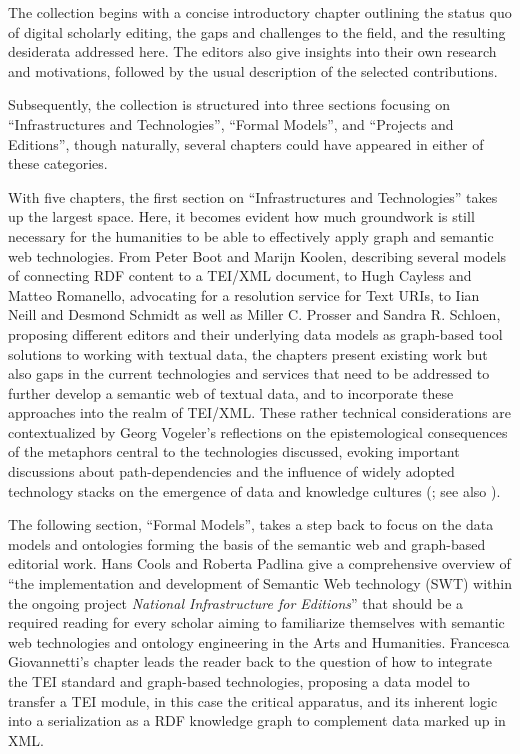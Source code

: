 \documentclass{article}
\begin{document}
The collection begins with a concise introductory chapter outlining the
status quo of digital scholarly editing, the gaps and challenges to the
field, and the resulting desiderata addressed here. The editors also
give insights into their own research and motivations, followed by the
usual description of the selected contributions.

Subsequently, the collection is structured into three sections focusing
on ``Infrastructures and Technologies'', ``Formal Models'', and
``Projects and Editions'', though naturally, several chapters could have
appeared in either of these categories.

With five chapters, the first section on ``Infrastructures and
Technologies'' takes up the largest space. Here, it becomes evident how
much groundwork is still necessary for the humanities to be able to
effectively apply graph and semantic web technologies. From Peter Boot
and Marijn Koolen, describing several models of connecting RDF content
to a TEI/XML document, to Hugh Cayless and Matteo Romanello, advocating
for a resolution service for Text URIs, to Iian Neill and Desmond
Schmidt as well as Miller C. Prosser and Sandra R. Schloen, proposing
different editors and their underlying data models as graph-based tool
solutions to working with textual data, the chapters present existing
work but also gaps in the current technologies and services that need to
be addressed to further develop a semantic web of textual data, and to
incorporate these approaches into the realm of TEI/XML. These rather
technical considerations are contextualized by Georg Vogeler's
reflections on the epistemological consequences of the metaphors central
to the technologies discussed, evoking important discussions about
path-dependencies and the influence of widely adopted technology stacks
on the emergence of data and knowledge cultures 
(\cite{mahoney_historical_2006}; see also \cite{acker_data_2019}).

The following section, ``Formal Models'', takes a step back to focus on
the data models and ontologies forming the basis of the semantic web and
graph-based editorial work. Hans Cools and Roberta Padlina give a
comprehensive overview of ``the implementation and development of
Semantic Web technology (SWT) within the ongoing project \emph{National
Infrastructure for Editions}'' that should be a required reading for
every scholar aiming to familiarize themselves with semantic web
technologies and ontology engineering in the Arts and Humanities.
Francesca Giovannetti's chapter leads the reader back to the question of
how to integrate the TEI standard and graph-based technologies,
proposing a data model to transfer a TEI module, in this case the
critical apparatus, and its inherent logic into a serialization as a RDF
knowledge graph to complement data marked up in XML.
\end{document}
